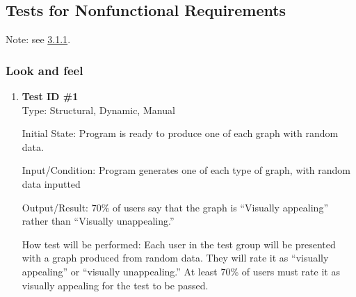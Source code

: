 \documentclass[12pt, titlepage]{article}
\begin{document}
	
\subsection{Tests for Nonfunctional Requirements}

Note: see \hyperref[sec:3.1.1]{3.1.1}.
		
\subsubsection{Look and feel}
\begin{enumerate}
\item{\textbf{Test ID \#1\\}}
Type: Structural, Dynamic, Manual
					
Initial State:  Program is ready to produce one of each graph with random data.
					
Input/Condition: Program generates one of each type of graph, with random data inputted
					
Output/Result:  70\% of users say that the graph is ``Visually appealing'' rather than ``Visually unappealing.''
					
How test will be performed: Each user in the test group will be presented with a graph produced from random data. They will rate it as ``visually appealing'' or ``visually unappealing.'' At least 70\% of users must rate it as visually appealing for the test to be passed.
					
\end{enumerate}
\end{document}
